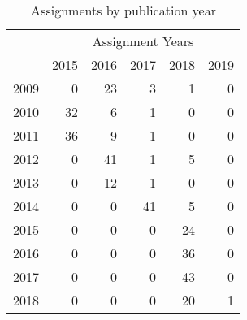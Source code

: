 \begin{table}[ht]
\centering
\caption{Assignments by publication year} 
\label{tab:assignments}
\begin{tabular}{rrrrrr}
  &\multicolumn{5}{c}{Assignment Years}\\ & 2015 & 2016 & 2017 & 2018 & 2019 \\ 
  \hline
2009 &   0 &  23 &   3 &   1 &   0 \\ 
  2010 &  32 &   6 &   1 &   0 &   0 \\ 
  2011 &  36 &   9 &   1 &   0 &   0 \\ 
  2012 &   0 &  41 &   1 &   5 &   0 \\ 
  2013 &   0 &  12 &   1 &   0 &   0 \\ 
  2014 &   0 &   0 &  41 &   5 &   0 \\ 
  2015 &   0 &   0 &   0 &  24 &   0 \\ 
  2016 &   0 &   0 &   0 &  36 &   0 \\ 
  2017 &   0 &   0 &   0 &  43 &   0 \\ 
  2018 &   0 &   0 &   0 &  20 &   1 \\ 
   \hline
\end{tabular}
\end{table}
